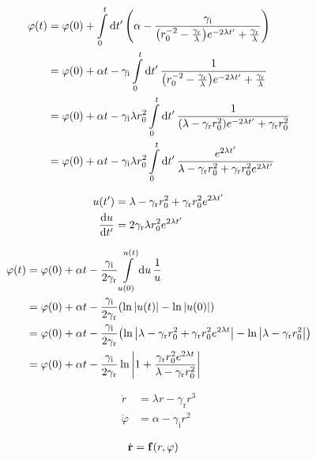 \documentclass[a4paper,10pt]{article}
\newcommand{\intl}{\int\limits}
\newcommand{\gammar}{\gamma_{\text{r}}}
\newcommand{\gammai}{\gamma_{\text{i}}}
\begin{document}
\begin{align}
	\varphi(t)
	&=
	\varphi(0)
	+
	\intl_{0}^t
	\dd{t^\prime}
	\pqty{
		\alpha
		-
		\frac{\gammai}
		{
			\pqty{
				r_0^{-2}
				-
				\frac{\gammar}{\lambda}	
			}
			e^{-2\lambda t^\prime}
			+
			\frac{\gammar}{\lambda}	
		}
	}
\\
	&=
	\varphi(0)
	+
	\alpha
	t
	-
	\gammai
	\intl_{0}^t
	\dd{t^\prime}
	\frac{1}
	{
		\pqty{
			r_0^{-2}
			-
			\frac{\gammar}{\lambda}	
		}
		e^{-2\lambda t^\prime}
		+
		\frac{\gammar}{\lambda}	
	}
\\
	&=
	\varphi(0)
	+
	\alpha
	t
	-
	\gammai
	\lambda
	r_0^2
	\intl_{0}^t
	\dd{t^\prime}
	\frac{1}
	{
		\pqty{
			\lambda
			-
			\gammar r_0^2	
		}
		e^{-2\lambda t^\prime}
		+
		\gammar r_0^2	
	}
\\
	&=
	\varphi(0)
	+
	\alpha
	t
	-
	\gammai
	\lambda
	r_0^2
	\intl_{0}^t
	\dd{t^\prime}
	\frac{e^{2\lambda t^\prime}}
	{
		\lambda
		-
		\gammar r_0^2
		+
		\gammar r_0^2
		e^{2\lambda t^\prime}
	}
\end{align}

\begin{align}
	u(t^\prime)
	&=
	\lambda
	-
	\gammar r_0^2
	+
	\gammar r_0^2
	e^{2\lambda t^\prime}
\\
	\dv{u}{t^\prime}
	&=
	2\gammar\lambda r_0^2
	e^{2\lambda t^\prime}
\end{align}

\begin{align}
	\varphi(t)
	&=
	\varphi(0)
	+
	\alpha
	t
	-
	\frac{\gammai}{2\gammar}
	\intl_{u(0)}^{u(t)}
	\dd{u}
	\frac{1}{u}
\\
	&=
	\varphi(0)
	+
	\alpha
	t
	-
	\frac{\gammai}{2\gammar}
	\pqty{
		\ln\abs{u(t)}
		-
		\ln\abs{u(0)}
	}
\\
	&=
	\varphi(0)
	+
	\alpha
	t
	-
	\frac{\gammai}{2\gammar}
	\pqty{
		\ln\abs{
			\lambda
			-
			\gammar r_0^2
			+
			\gammar r_0^2
			e^{2\lambda t}		
		}
		-
		\ln\abs{
			\lambda
			-
			\gammar r_0^2
		}
	}
\\
	&=
	\varphi(0)
	+
	\alpha
	t
	-
	\frac{\gammai}{2\gammar}
	\ln\abs{
		1
		+
		\frac{
			\gammar r_0^2
			e^{2\lambda t}
		}
		{
			\lambda
			-
			\gammar r_0^2
		}	
	}
\end{align}


\begin{align}
	\dot{r}
	&=
	\lambda r
	-
	\gammar
	r^3
\\
	\dot{\varphi}
	&=
	\alpha
	-
	\gammai
	r^2
\end{align}

\begin{align}
	\dot{\vb{r}}
	&=
	\vb{f}
	(r,\varphi)
\end{align}
\end{document}

